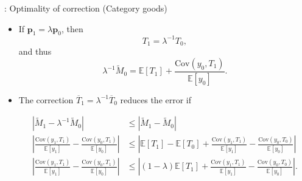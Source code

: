 \documentclass[10pt, handout]{beamer}
\begin{document}
\begin{frame}[label=Category-OptimalityCondition,plain,noframenumbering]{\secname: Optimality of correction (Category goods)\,\hyperlink{Category-Error}{\beamerreturnbutton}}
	\vfill
	\begin{itemize}
		\item If $\mathbf{p}_{1} = \lambda \mathbf{p}_{0}$, then
				$$T_{1} = \lambda^{-1}T_{0},$$
			and thus
				$$\lambda^{-1}\tilde{M}_{0} = \mathbb{E}[T_{1}] + \frac{\mathrm{Cov}\left(y_{0}, T_{1} \right)}{\mathbb{E}[y_{0}]}.$$ \vfill
	
		\item The correction $\overline{T}_{1} = \lambda^{-1}\overline{T}_{0}$ reduces the error if
				\begin{small}$$\begin{aligned}
					\left|\tilde{M}_{1} - \lambda^{-1}\tilde{M}_{0} \right|
						&\leq \left|\tilde{M}_{1} - \tilde{M}_{0} \right|	\\
					\left| \frac{\mathrm{Cov}\left(y_{1}, T_{1} \right)}{\mathbb{E}[y_{1}]} - \frac{\mathrm{Cov}\left(y_{0}, T_{1} \right)}{\mathbb{E}[y_{0}]} \right|
						&\leq \left| \mathbb{E}\left[T_{1} \right] - \mathbb{E}\left[T_{0} \right] + \frac{\mathrm{Cov}\left(y_{1}, T_{1} \right)}{\mathbb{E}[y_{1}]} - \frac{\mathrm{Cov}\left(y_{0}, T_{0} \right)}{\mathbb{E}[y_{0}]} \right|	\\
					\left| \frac{\mathrm{Cov}\left(y_{1}, T_{1} \right)}{\mathbb{E}[y_{1}]} - \frac{\mathrm{Cov}\left(y_{0}, T_{1} \right)}{\mathbb{E}[y_{0}]} \right|
						&\leq \left| (1-\lambda)\mathbb{E}\left[T_{1} \right] + \frac{\mathrm{Cov}\left(y_{1}, T_{1} \right)}{\mathbb{E}[y_{1}]} - \frac{\mathrm{Cov}\left(y_{0}, T_{0} \right)}{\mathbb{E}[y_{0}]} \right|.
				\end{aligned}$$\end{small} \vfill
	\end{itemize}
\end{frame}
\end{document}
